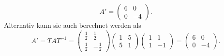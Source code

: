 \begin{loesung}
\begin{teilaufgaben}
\[
    A' = \begin{pmatrix}
          6 & 0\\ 0 & -4
         \end{pmatrix}.
\]
Alternativ kann sie auch berechnet werden als
\[
    A' = TAT^{-1} =  
    \begin{pmatrix}\frac{1}{2} & \frac{1}{2}\\ \frac{1}{2} & -\frac{1}{2} \end{pmatrix}
    \begin{pmatrix} 1&5\\ 5&1 \end{pmatrix}
    \begin{pmatrix}1 & 1\\ 1 & -1 \end{pmatrix}
    = \begin{pmatrix}
          6 & 0\\ 0 & -4
         \end{pmatrix}.
\]
\qedhere
\end{teilaufgaben}
\end{loesung}

